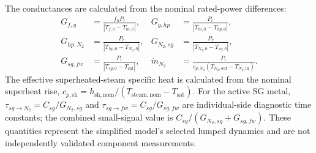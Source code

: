 The conductances are calculated from the nominal rated-power differences:
\begin{align}
 G_{f,g}&=\frac{f_hP_r}{|T_{f,0}-T_{m,0}|},
 &G_{g,hp}&=\frac{P_r}{|T_{m,0}-T_{hp,0}|},\nonumber\\
 G_{hp,N_2}&=\frac{P_r}{|T_{hp,0}-T_{N_2,0}|},
 &G_{N_2,sg}&=\frac{P_r}{|T_{N_2,0}-T_{sg,0}|},\nonumber\\
 G_{sg,fw}&=\frac{P_r}{|T_{sg,0}-T_{\mathrm{sat}}|},
 &\dot m_{N_2}&=\frac{P_r}{c_{p,N_2}(T_{N_2,\mathrm{out}}-T_{N_2,\mathrm{in}})}.
 \label{eq:app:conductances}
\end{align}
The effective superheated-steam specific heat is calculated from the nominal superheat rise, $c_{p,\mathrm{sh}}=h_{\mathrm{sh,nom}}/(T_{\mathrm{steam,nom}}-T_{\mathrm{sat}})$. For the active SG metal, $\tau_{sg\to N_2}=C_{sg}/G_{N_2,sg}$ and $\tau_{sg\to fw}=C_{sg}/G_{sg,fw}$ are individual-side diagnostic time constants; the combined small-signal value is $C_{sg}/(G_{N_2,sg}+G_{sg,fw})$. These quantities represent the simplified model's selected lumped dynamics and are not independently validated component measurements.
